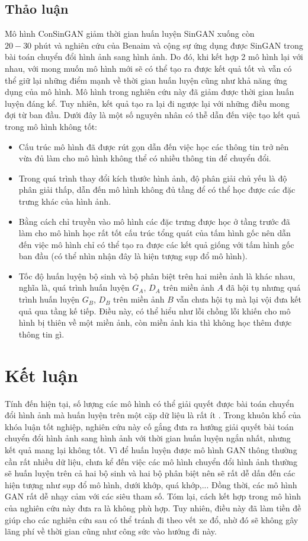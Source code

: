 \documentclass[12pt]{report}%
\begin{document}
\section{Thảo luận}
Mô hình ConSinGAN giảm thời gian huấn luyện SinGAN xuống còn $20-30\text{ phút}$ và nghiên cứu của Benaim và cộng sự ứng dụng được SinGAN trong bài toán chuyển đổi hình ảnh sang hình ảnh.
Do đó, khi kết hợp 2 mô hình lại với nhau, với mong muốn mô hình mới sẽ có thể tạo ra được kết quả tốt và vẫn có thể giữ lại những điểm mạnh về thời gian huấn luyện cũng như khả năng ứng dụng của mô hình. Mô hình trong nghiên cứu này đã giảm được thời gian huấn luyện đáng kể.
Tuy nhiên, kết quả tạo ra lại đi ngược lại với những  điều  mong đợi từ ban đầu. Dưới đây là một số nguyên nhân có thễ dẫn đến việc tạo kết quả trong mô hình không tốt:
\begin{itemize}
    \item Cấu trúc mô hình đã được rút gọn dẫn đến việc học các thông tin trở nên vừa đủ làm cho mô hình không thể có nhiều thông tin để chuyển đổi.
    \item Trong quá trình thay đổi kích thước hình ảnh, độ phân giải chủ yếu là độ phân giải thấp, dẫn đến  mô hình  không đủ tầng để có thể học được các đặc trưng khác của hình ảnh.
    \item Bằng cách chỉ truyền vào mô hình các đặc trưng được học ở tầng trước đã làm cho mô hình học rất tốt cấu trúc tổng quát của tấm hình gốc  nên dẫn đến việc mô hình chỉ có thể tạo ra được các kết quả giống với tấm hình gốc ban đầu (có thể nhìn nhận đây là hiện tượng sụp đổ mô hình).
    \item Tốc độ huấn luyện bộ sinh và bộ phân biệt trên hai miền ảnh là khác nhau, nghĩa là, quá trình huấn luyện $G_A$, $D_A$ trên miền ảnh $A$ đã hội tụ nhưng quá trình huấn luyện $G_B$, $D_B$ trên miền ảnh $B$ vẫn chưa hội tụ mà  lại vội đưa kết quả qua tầng kế tiếp. Điều này, có thể hiểu như lỗi chồng lỗi khiến cho mô hình bị thiên về một miền ảnh, còn miền ảnh kia thì không học thêm được thông tin gì.
\end{itemize}

\clearpage
\chapter{Kết luận}
Tính đến hiện tại, số lượng các mô hình có thể giải quyết được bài toán chuyển đổi hình ảnh mà huấn luyện trên một cặp dữ liệu là rất ít \cite{benaim2020structuralanalogy,lin2020tuigan}.
Trong khuôn khổ của khóa luận tốt nghiệp, nghiên cứu này cố gắng đưa ra hướng giải quyết bài toán chuyển đổi hình ảnh sang hình ảnh với thời gian huấn luyện ngắn nhất, nhưng kết quả mang lại không tốt. Vì để huấn luyện được mô hình GAN thông thường  cần rất nhiều dữ liệu, chưa kể đến việc các mô hình chuyển đổi hình ảnh thường sẽ huấn luyện trên cả hai bộ sinh và hai bộ phân biệt nên sẽ rất dễ dấn đến các hiện tượng như  sụp đổ mô hình, dưới khớp, quá khớp,... Đồng thời, các mô hình GAN rất dễ nhạy cảm với các siêu tham số.
Tóm lại, cách kết hợp trong mô hình của nghiên cứu này đưa ra là không phù hợp. Tuy nhiên, điều này đã làm tiền đề giúp cho các nghiên cứu sau có thể tránh đi theo vết xe đổ, nhờ đó sẽ không gây lãng phí về thời gian cũng như công sức vào hướng đi này.
\end{document}

